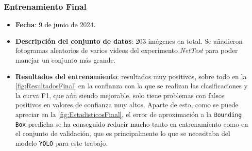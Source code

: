 \clearpage

\subsubsection*{Entrenamiento Final}
\label{train:final}
\begin{itemize}
    \item \textbf{Fecha}: 9 de junio de 2024.
    \item \textbf{Descripción del conjunto de datos}: 203 imágenes en total. Se añadieron fotogramas aleatorios de varios videos del experimento \textit{NetTest} para poder manejar un conjunto más grande.
    \item \textbf{Resultados del entrenamiento}: resultados muy positivos, sobre todo en la \autoref{fig:ResultadosFinal} en la confianza con la que se realizan las clasificaciones y la curva F1, que aún siendo mejorable, solo tiene problemas 
    con falsos positivos en valores de confianza muy altos. Aparte de esto, como se puede apreciar en la \autoref{fig:EstadisticosFinal}, el error de aproximación a la \texttt{Bounding Box} predicha se ha 
    conseguido reducir mucho tanto en entrenamiento como en el conjunto de validación, que es principalmente lo que se necesitaba del modelo \texttt{YOLO} para este trabajo.
    

\end{itemize}
